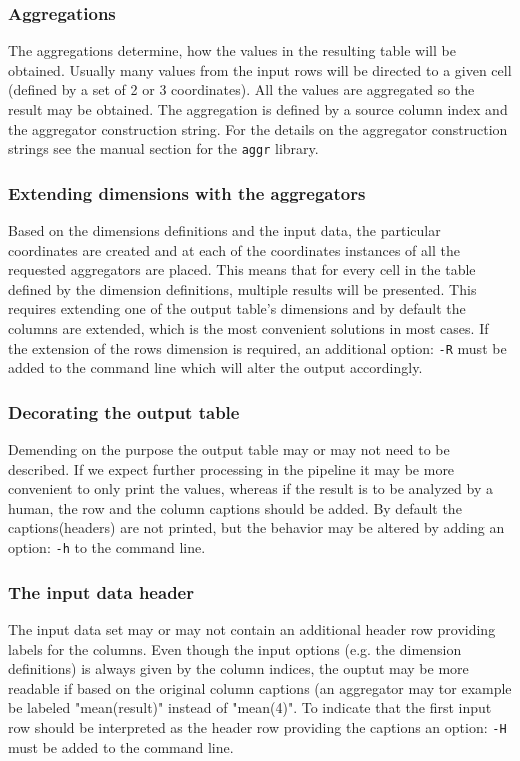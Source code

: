 \documentclass{report}
\begin{document}
	\subsubsection{Aggregations}
	The aggregations determine, how the values in the resulting table will be obtained.
	Usually many values from the input rows will be directed to a given cell (defined
	by a set of 2 or 3 coordinates). All the values are aggregated so the result may
	be obtained. The aggregation is defined by a source column index and the aggregator
	construction string. For the details on the aggregator construction strings see
	the manual section for the \texttt{aggr} library.

	\subsubsection{Extending dimensions with the aggregators}
	Based on the dimensions definitions and the input data, the particular coordinates
	are created and at each of the coordinates instances of all the requested aggregators
	are placed. This means that for every cell in the table defined by the dimension
	definitions, multiple results will be presented. This requires extending one of the
	output table's dimensions and by default the columns are extended, which is the
	most convenient solutions in most cases. If the extension of the rows dimension
	is required, an additional option: \texttt{-R} must be added to the command line
	which will alter the output accordingly.

	\subsubsection{Decorating the output table}
	Demending on the purpose the output table may or may not need to be described. If
	we expect further processing in the pipeline it may be more convenient to only
	print the values, whereas if the result is to be analyzed by a human, the row and
	the column captions should be added. By default the captions(headers) are not
	printed, but the behavior may be altered by adding an option: \texttt{-h} to the
	command line.

	\subsubsection{The input data header}
	The input data set may or may not contain an additional header row providing
	labels for the columns. Even though the input options (e.g. the dimension
	definitions) is always given by the column indices, the ouptut may be more
	readable if based on the original column captions (an aggregator may tor example
	be labeled "mean(result)" instead of "mean(4)". To indicate that the first input
	row should be interpreted as the header row providing the captions an option:
	\texttt{-H} must be added to the command line.
\end{document}
